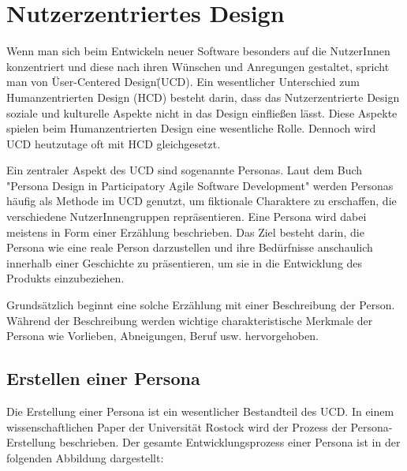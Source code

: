 \section{Nutzerzentriertes Design}

Wenn man sich beim Entwickeln neuer Software besonders auf die NutzerInnen konzentriert und diese nach ihren Wünschen und Anregungen gestaltet, spricht man von \"User-Centered Design\" (\acs{UCD}). Ein wesentlicher Unterschied zum Humanzentrierten Design (\acs{HCD}) besteht darin, dass das Nutzerzentrierte Design soziale und kulturelle Aspekte nicht in das Design einfließen lässt. \cite{hcd2:2021} Diese Aspekte spielen beim Humanzentrierten Design eine wesentliche Rolle. Dennoch wird \acs{UCD} heutzutage oft mit \acs{HCD} gleichgesetzt. \cite{ucd1:2011}



Ein zentraler Aspekt des \acs{UCD} sind sogenannte Personas. Laut dem Buch "Persona Design in Participatory Agile Software Development" werden Personas häufig als Methode im \acs{UCD} genutzt, um fiktionale Charaktere zu erschaffen, die verschiedene NutzerInnengruppen repräsentieren. \cite{personaDesign:2020} Eine Persona wird dabei meistens in Form einer Erzählung beschrieben. \cite{ucd1:2011} Das Ziel besteht darin, die Persona wie eine reale Person darzustellen und ihre Bedürfnisse anschaulich innerhalb einer Geschichte zu präsentieren, um sie in die Entwicklung des Produkts einzubeziehen. \cite{ucd1:2011}

Grundsätzlich beginnt eine solche Erzählung mit einer Beschreibung der Person. \cite{ucd1:2011} Während der Beschreibung werden wichtige charakteristische Merkmale der Persona wie Vorlieben, Abneigungen, Beruf usw. hervorgehoben. \cite{ucd1:2011}

\subsection{Erstellen einer Persona}
Die Erstellung einer Persona ist ein wesentlicher Bestandteil des \acs{UCD}. In einem wissenschaftlichen Paper der Universität Rostock wird der Prozess der Persona-Erstellung beschrieben. Der gesamte Entwicklungsprozess einer Persona ist in der folgenden Abbildung dargestellt:

